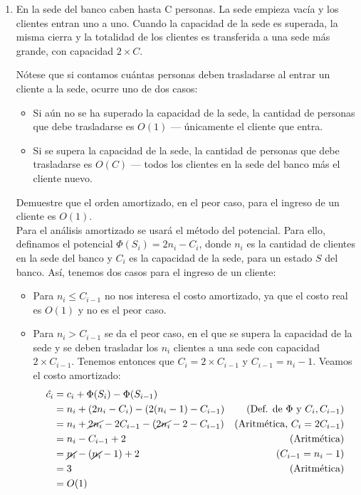 \documentclass[letterpaper, 12pt]{article}
\begin{document}
\begin{enumerate}
\item  En la sede del banco caben hasta C personas. La sede empieza vacía y los
clientes entran uno a uno. Cuando la capacidad de la sede es superada, la misma cierra y la totalidad de los clientes es transferida a una sede más grande, con capacidad $2 \times C$.

Nótese que si contamos cuántas personas deben trasladarse al entrar un cliente a la sede, ocurre uno de dos casos:

\begin{itemize}
    \item Si aún no se ha superado la capacidad de la sede, la cantidad de personas que debe trasladarse es $O(1)$ — únicamente el cliente que entra.
    \item Si se supera la capacidad de la sede, la cantidad de personas que debe trasladarse es $O(C)$ — todos los clientes en la sede del banco más el cliente nuevo.
\end{itemize}

Demuestre que el orden amortizado, en el peor caso, para el ingreso de un cliente es $O(1)$. \\

Para el análisis amortizado se usará el método del potencial. Para ello, definamos el potencial $\Phi(S_i) = 2n_i - C_i$, donde $n_i$ es la cantidad de clientes en la sede del banco y $C_i$ es la capacidad de la sede, para un estado $S$ del banco. Así, tenemos dos casos para el ingreso de un cliente:

\begin{itemize}
    \item Para $n_i \leq C_{i-1}$ no nos interesa el costo amortizado, ya que el costo real es $O(1)$ y no es el peor caso.
    \item Para $n_i > C_{i-1}$ se da el peor caso, en el que se supera la capacidad de la sede y se deben trasladar los $n_i$ clientes a una sede con capacidad $2 \times C_{i-1}$. Tenemos entonces que $C_i = 2 \times C_{i-1}$ y $C_{i-1} = n_i - 1$. Veamos el costo amortizado:
    \begin{align*}
        \hat{c_i} &= c_i + \Phi(S_i) - \Phi(S_{i-1}) &\\
        &= n_i + (2n_i - C_i) - (2(n_i - 1) - C_{i-1}) & (\text{Def. de } \Phi \text{ y } C_i, C_{i-1}) \\
        &= n_i + \cancel{2n_i} - 2C_{i-1} - (\cancel{2n_i} - 2 - C_{i-1}) & (\text{Aritmética, } C_i = 2C_{i-1}) \\
        &= n_i - C_{i-1} + 2 & (\text{Aritmética}) \\
        &= \cancel{n_i} - (\cancel{n_i} - 1) + 2 & (C_{i-1} = n_i - 1) \\
        &= 3 & (\text{Aritmética}) \\
        &= O(1)
    \end{align*}


\end{itemize}
\end{enumerate}
\end{document}

